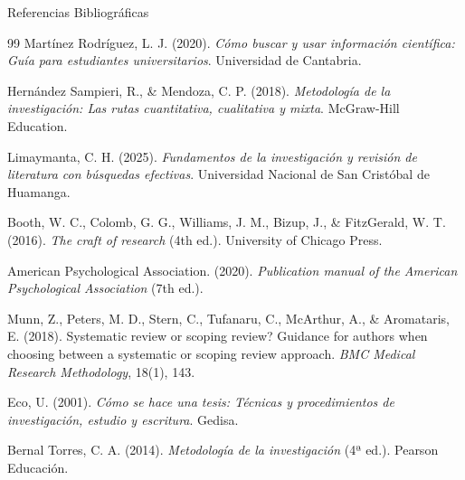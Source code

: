 \documentclass[11pt,aspectratio=169]{beamer}
\begin{document}
\begin{frame}[allowframebreaks]{Referencias Bibliográficas}
	\footnotesize
	\begin{thebibliography}{99}
		Martínez Rodríguez, L. J. (2020).
		\textit{Cómo buscar y usar información científica: Guía para estudiantes universitarios}.
		Universidad de Cantabria.

		Hernández Sampieri, R., \& Mendoza, C. P. (2018).
		\textit{Metodología de la investigación: Las rutas cuantitativa, cualitativa y mixta}.
		McGraw-Hill Education.

		Limaymanta, C. H. (2025).
		\textit{Fundamentos de la investigación y revisión de literatura con búsquedas efectivas}.
		Universidad Nacional de San Cristóbal de Huamanga.

		Booth, W. C., Colomb, G. G., Williams, J. M., Bizup, J., \& FitzGerald, W. T. (2016).
		\textit{The craft of research} (4th ed.).
		University of Chicago Press.

		American Psychological Association. (2020).
		\textit{Publication manual of the American Psychological Association} (7th ed.).

		Munn, Z., Peters, M. D., Stern, C., Tufanaru, C., McArthur, A., \& Aromataris, E. (2018).
		Systematic review or scoping review? Guidance for authors when choosing between a systematic or scoping review approach.
		\textit{BMC Medical Research Methodology}, 18(1), 143.

		Eco, U. (2001).
		\textit{Cómo se hace una tesis: Técnicas y procedimientos de investigación, estudio y escritura}.
		Gedisa.

		Bernal Torres, C. A. (2014).
		\textit{Metodología de la investigación} (4ª ed.).
		Pearson Educación.
	\end{thebibliography}
\end{frame}
\end{document}
